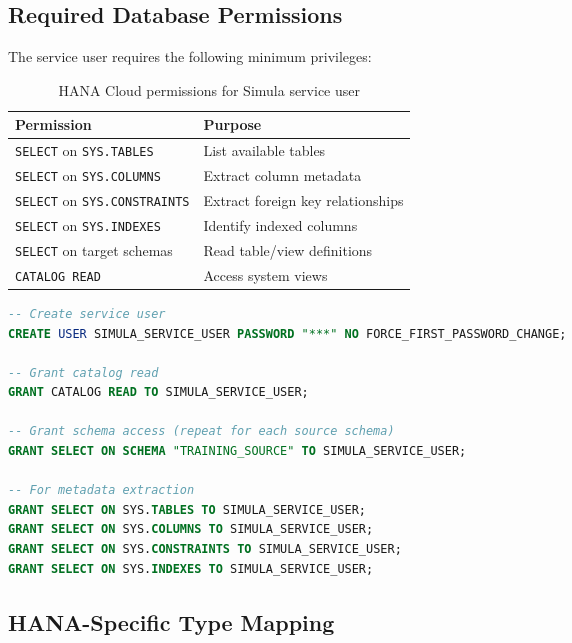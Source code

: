 \documentclass[12pt,a4paper,twoside]{report}
\begin{document}
\subsection{Required Database Permissions}

The service user requires the following minimum privileges:

\begin{table}[H]
\centering
\caption{HANA Cloud permissions for Simula service user}
\label{tab:hana-permissions}
\begin{tabularx}{\textwidth}{@{}l X@{}}
\toprule
\textbf{Permission} & \textbf{Purpose} \\
\midrule
\texttt{SELECT} on \texttt{SYS.TABLES} & List available tables \\
\texttt{SELECT} on \texttt{SYS.COLUMNS} & Extract column metadata \\
\texttt{SELECT} on \texttt{SYS.CONSTRAINTS} & Extract foreign key relationships \\
\texttt{SELECT} on \texttt{SYS.INDEXES} & Identify indexed columns \\
\texttt{SELECT} on target schemas & Read table/view definitions \\
\texttt{CATALOG READ} & Access system views \\
\bottomrule
\end{tabularx}
\end{table}

\begin{lstlisting}[language=SQL,caption={Granting minimum permissions}]
-- Create service user
CREATE USER SIMULA_SERVICE_USER PASSWORD "***" NO FORCE_FIRST_PASSWORD_CHANGE;

-- Grant catalog read
GRANT CATALOG READ TO SIMULA_SERVICE_USER;

-- Grant schema access (repeat for each source schema)
GRANT SELECT ON SCHEMA "TRAINING_SOURCE" TO SIMULA_SERVICE_USER;

-- For metadata extraction
GRANT SELECT ON SYS.TABLES TO SIMULA_SERVICE_USER;
GRANT SELECT ON SYS.COLUMNS TO SIMULA_SERVICE_USER;
GRANT SELECT ON SYS.CONSTRAINTS TO SIMULA_SERVICE_USER;
GRANT SELECT ON SYS.INDEXES TO SIMULA_SERVICE_USER;
\end{lstlisting}

\subsection{HANA-Specific Type Mapping}
\end{document}
